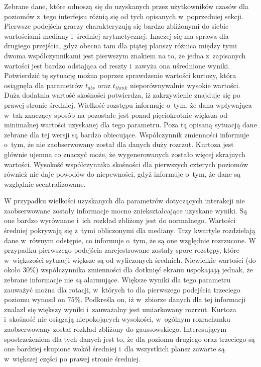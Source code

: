 \documentclass[a4paper,12pt,numbers=noenddot]{report}
\begin{document}
Zebrane dane, które odnoszą się do uzyskanych przez użytkowników czasów dla poziomów z~tego interfejsu różnią się od tych opisanych w~poprzedniej sekcji. Pierwsze podejścia graczy charakteryzują się bardzo zbliżonymi do siebie wartościami mediany i~średniej arytmetycznej. Inaczej się ma sprawa dla drugiego przejścia, gdyż obecna tam dla piątej planszy różnica między tymi dwoma współczynnikami jest pierwszym znakiem na to, że jedna z~zapisanych wartości jest bardzo odstająca od reszty i~zawyża ona uśrednione wyniki. Potwierdzić tę sytuację można poprzez sprawdzenie wartości kurtozy, która osiągnęła dla parametrów $t_{abs}$ oraz $t_{think}$ nieporównywalnie wysokie wartości. Duża dodatnia wartość skośności potwierdza, iż zakrzywienie znajduje się po prawej stronie średniej. Wielkość rozstępu informuje o~tym, że dana wpływająca w~tak znaczący sposób na pozostałe jest ponad pięciokrotnie większa od minimalnej wartości uzyskanej dla tego parametru. Poza tą opisaną sytuacją dane zebrane dla tej wersji są bardzo obiecujące. 
Współczynnik zmienności informuje o~tym, że nie zaobserwowany został dla danych duży rozrzut. Kurtoza jest głównie ujemna co znaczyć może, że wygenerowanych zostało więcej skrajnych wartości. Wysokość współczynnika skośności dla pierwszych czterych poziomów również nie daje powodów do niepewności, gdyż informuje o~tym, że dane są względnie scentralizowane.

W przypadku wielkości uzyskanych dla parametrów dotyczących interakcji nie zaobserwowane zostały informacje mocno zniekształcające uzyskane wyniki. Są one bardzo wyrównane i~ich rozkład zbliżony jest do normalnego. Wartości średniej pokrywają się z~tymi obliczonymi dla mediany. Trzy kwartyle rozdzielają dane w~równym odstępie, co informuje o~tym, że są one względnie rozrzucone. W przypadku pierwszego podejścia zarejestrowane zostały spore rozstępy, które w~większości sytuacji większe są od wyliczonych średnich. Niewielkie wartości (do około 30\%) współczynnika zmienności dla dotknięć ekranu uspokajają jednak, że zebrane informacje nie są alarmujące. Większe wyniki dla tego parametru zauważyć można dla rotacji, w~których to dla pierwszego podejścia trzeciego poziomu wynosił on 75\%. Podkreśla on, iż w~zbiorze danych dla tej informacji znalazł się większy wyniki i~zauważalny jest umiarkowany rozrzut. Kurtoza i~skośność nie osiągają niepokojących wysokości, w~ogólnym rozrachunku zaobserwowany został rozkład zbliżony do gaussowskiego. Interesującym spostrzeżeniem dla tych danych jest to, że dla poziomu drugiego oraz trzeciego są one bardziej skupione wokół średniej i~dla wszystkich plansz zawarte są w~większej części po prawej stronie średniej.\\
\end{document}
